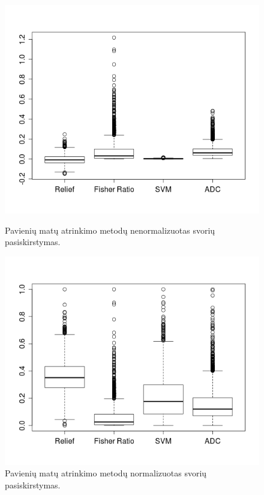 \begin{figure}[ht]
\begin{minipage}[b]{0.45\linewidth}
\centering
\includegraphics[width=1\textwidth]{images/boxplot_colon_all.png}
\caption{Pavienių matų atrinkimo metodų nenormalizuotas svorių pasiskirstymas.}
\label{fig:figure1}
\end{minipage}
\hspace{0.2cm}
\begin{minipage}[b]{0.45\linewidth}
\centering
\includegraphics[width=1\textwidth]{images/boxplot_colon_all_normalized.png}
\caption{Pavienių matų atrinkimo metodų normalizuotas svorių pasiskirstymas.}
\label{fig:figure2}
\end{minipage}
\end{figure}

